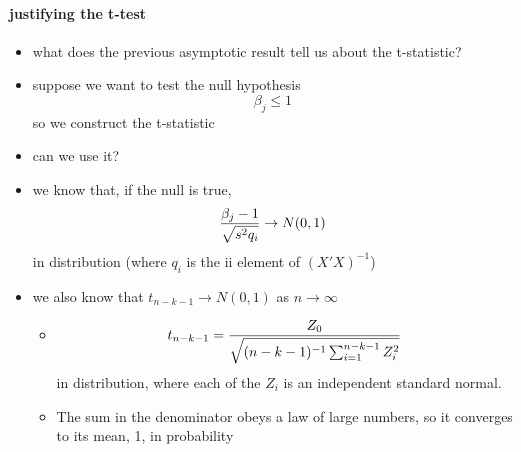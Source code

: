 \paragraph{justifying the t-test}
\begin{itemize}
\item what does the previous asymptotic result tell us about the t-statistic?
\item suppose we want to test the null hypothesis
         \[ \beta_j \leq 1 \] so we construct the t-statistic
\item can we use it?
\item we know that, if the null is true,
         \[ {\beta_j - 1 \over \sqrt{s^2 q_i}} \to N(0,1) \] in
         distribution (where $q_i$ is the ii element of $(X'X)^{-1}$)
\item we also know that $t_{n-k-1} \to N(0,1)$ as $n\to\infty$
\begin{itemize}
\item \[t_{n-k-1} = {Z_0 \over \sqrt{(n-k-1)^{-1} \sum_{i=1}^{n-k-1}
           Z_i^2}}\] in distribution, where each of the $Z_i$ is an
           independent standard normal.
\item The sum in the denominator obeys a law of large numbers, so
           it converges to its mean, 1, in probability
\end{itemize}
\end{itemize}

